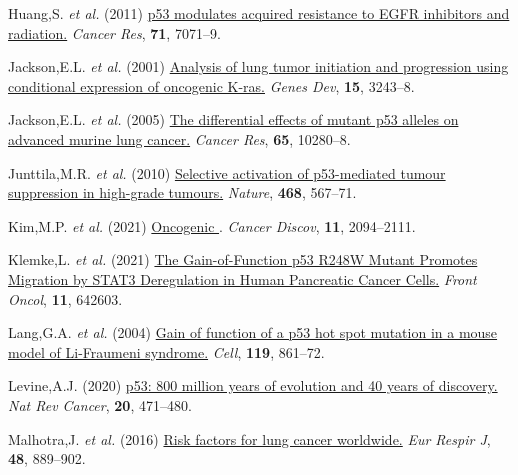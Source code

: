 \begin{CSLReferences}{1}{0}
\leavevmode{}%
Huang,S. \emph{et al.} (2011) \href{https://doi.org/10.1158/0008-5472.can-11-0128}{p53 modulates acquired resistance to EGFR inhibitors and radiation.} \emph{Cancer Res}, \textbf{71}, 7071--9.

\leavevmode{}%
Jackson,E.L. \emph{et al.} (2001) \href{https://doi.org/10.1101/gad.943001}{Analysis of lung tumor initiation and progression using conditional expression of oncogenic K-ras.} \emph{Genes Dev}, \textbf{15}, 3243--8.

\leavevmode{}%
Jackson,E.L. \emph{et al.} (2005) \href{https://doi.org/10.1158/0008-5472.can-05-2193}{The differential effects of mutant p53 alleles on advanced murine lung cancer.} \emph{Cancer Res}, \textbf{65}, 10280--8.

\leavevmode{}%
Junttila,M.R. \emph{et al.} (2010) \href{https://doi.org/10.1038/nature09526}{Selective activation of p53-mediated tumour suppression in high-grade tumours.} \emph{Nature}, \textbf{468}, 567--71.

\leavevmode{}%
Kim,M.P. \emph{et al.} (2021) \href{https://doi.org/10.1158/2159-8290.cd-20-1228}{Oncogenic }. \emph{Cancer Discov}, \textbf{11}, 2094--2111.

\leavevmode{}%
Klemke,L. \emph{et al.} (2021) \href{https://doi.org/10.3389/fonc.2021.642603}{The Gain-of-Function p53 R248W Mutant Promotes Migration by STAT3 Deregulation in Human Pancreatic Cancer Cells.} \emph{Front Oncol}, \textbf{11}, 642603.

\leavevmode{}%
Lang,G.A. \emph{et al.} (2004) \href{https://doi.org/10.1016/j.cell.2004.11.006}{Gain of function of a p53 hot spot mutation in a mouse model of Li-Fraumeni syndrome.} \emph{Cell}, \textbf{119}, 861--72.

\leavevmode{}%
Levine,A.J. (2020) \href{https://doi.org/10.1038/s41568-020-0262-1}{p53: 800 million years of evolution and 40 years of discovery.} \emph{Nat Rev Cancer}, \textbf{20}, 471--480.

\leavevmode{}%
Malhotra,J. \emph{et al.} (2016) \href{https://doi.org/10.1183/13993003.00359-2016}{Risk factors for lung cancer worldwide.} \emph{Eur Respir J}, \textbf{48}, 889--902.


\end{CSLReferences}
